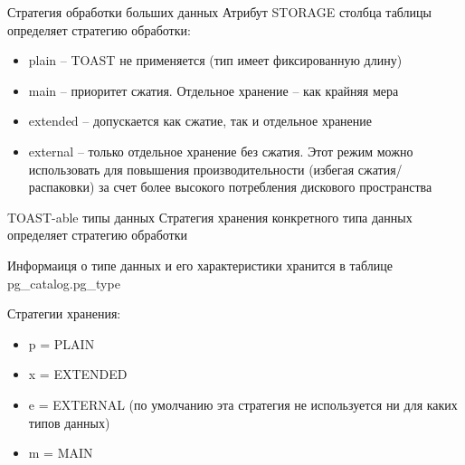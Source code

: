\documentclass[12pt]{article}
\begin{document}
\begin{nota}{Стратегия обработки больших данных}
    Атрибут STORAGE столбца таблицы определяет стратегию обработки:

    \begin{itemize}
        \item plain -- TOAST не применяется (тип имеет фиксированную длину)
        \item main -- приоритет сжатия. Отдельное хранение -- как крайняя мера 
        \item extended -- допускается как сжатие, так и отдельное хранение 
        \item external -- только отдельное хранение без сжатия. Этот режим можно использовать для повышения производительности (избегая сжатия/распаковки) за счет более высокого потребления дискового пространства
    \end{itemize}
\end{nota}

\begin{nota}{TOAST-able типы данных}
    Стратегия хранения конкретного типа данных определяет стратегию обработки 

    Информаиця о типе данных и его характеристики хранится в таблице pg\_catalog.pg\_type 

    Стратегии хранения:

    \begin{itemize}
        \item p = PLAIN 
        \item x = EXTENDED 
        \item e = EXTERNAL (по умолчанию эта стратегия не используется ни для каких типов данных)
        \item m = MAIN
    \end{itemize}
\end{nota}
\end{document}
